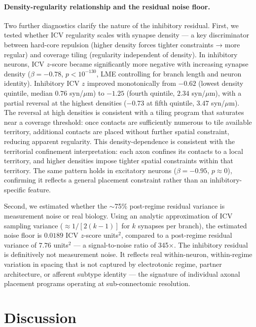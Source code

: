 \documentclass[11pt]{article}
\begin{document}
\paragraph{Density-regularity relationship and the residual noise floor.}
Two further diagnostics clarify the nature of the inhibitory residual. First, we tested whether ICV regularity scales with synapse density — a key discriminator between hard-core repulsion (higher density forces tighter constraints → more regular) and coverage tiling (regularity independent of density). In inhibitory neurons, ICV $z$-score became significantly more negative with increasing synapse density ($\beta = -0.78$, $p < 10^{-130}$, LME controlling for branch length and neuron identity). Inhibitory ICV $z$ improved monotonically from $-0.62$ (lowest density quintile, median $0.76$ syn/$\mu$m) to $-1.25$ (fourth quintile, $2.34$ syn/$\mu$m), with a partial reversal at the highest densities ($-0.73$ at fifth quintile, $3.47$ syn/$\mu$m). The reversal at high densities is consistent with a tiling program that saturates near a coverage threshold: once contacts are sufficiently numerous to tile available territory, additional contacts are placed without further spatial constraint, reducing apparent regularity. This density-dependence is consistent with the territorial confinement interpretation: each axon confines its contacts to a local territory, and higher densities impose tighter spatial constraints within that territory. The same pattern holds in excitatory neurons ($\beta = -0.95$, $p \approx 0$), confirming it reflects a general placement constraint rather than an inhibitory-specific feature.

Second, we estimated whether the $\sim$75\% post-regime residual variance is measurement noise or real biology. Using an analytic approximation of ICV sampling variance ($ \approx 1 / [2(k-1)]$ for $k$ synapses per branch), the estimated noise floor is $0.0189$ ICV $z$-score units$^2$, compared to a post-regime residual variance of $7.76$ units$^2$ --- a signal-to-noise ratio of 345×. The inhibitory residual is definitively not measurement noise. It reflects real within-neuron, within-regime variation in spacing that is not captured by electrotonic regime, partner architecture, or afferent subtype identity — the signature of individual axonal placement programs operating at sub-connectomic resolution.


\section{Discussion}
\end{document}
